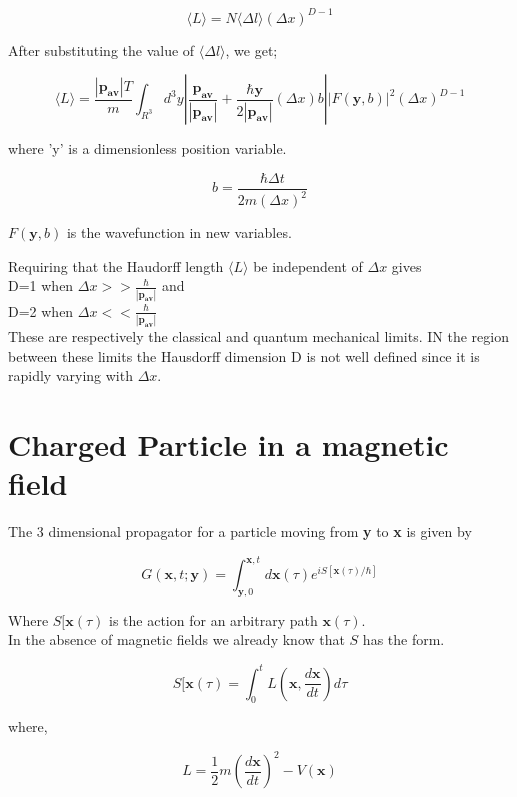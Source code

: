 \documentclass[14pt]{extarticle}
\begin{document}
$$ \langle L \rangle = N \langle \Delta l \rangle (\Delta x)^{D-1}$$

After substituting the value of $\langle \Delta l \rangle$, we get;

$$\langle L \rangle = \frac{|\mathbf{p_{av}}|T}{m} \int_{R^3} d^3 y \left| \frac{\mathbf{p_{av}}}{|\mathbf{p_{av}}|} + \frac{\hbar \mathbf{y}}{2|\mathbf{p_{av}}|} (\Delta x)b     \right| |F(\mathbf{y},b)|^2 (\Delta x)^{D-1}  $$

where 'y' is a dimensionless position variable.

$$b= \frac{\hbar \Delta t}{2m (\Delta x)^2}$$

$F(\mathbf{y},b)$ is the wavefunction in new variables.

Requiring that the Haudorff length $\langle L \rangle$ be independent of $\Delta x$ gives\\

 D=1 when $\Delta x>> \frac{\hbar}{|\mathbf{p_{av}}|}$ and\\

 D=2 when $\Delta x<< \frac{\hbar}{|\mathbf{p_{av}}|}$\\

These are respectively the classical and quantum mechanical limits. IN the region between these limits the Hausdorff dimension D is not well defined since it is rapidly varying with $\Delta x$.

\newpage

\section{Charged Particle in a magnetic field}

The 3 dimensional propagator for a particle moving from \textbf{y} to \textbf{x} is given by

$$G(\textbf{x},t;\textbf{y}) = \int_{\textbf{y},0}^{\textbf{x},t} d\textbf{x}(\tau) e^{iS[\textbf{x}(\tau)/\hbar]}$$

Where $S[\textbf{x}(\tau)$ is the action for an arbitrary path $\textbf{x}(\tau)$.\\

In the absence of magnetic fields we already know that $S$ has the form.

$$S[\textbf{x}(\tau) = \int_0^t L \left( \textbf{x}, \frac{d\textbf{x}}{dt} \right) d\tau$$

where,

$$L = \frac{1}{2} m \left( \frac{d\textbf{x}}{dt} \right)^2 - V(\textbf{x}) $$
\end{document}
